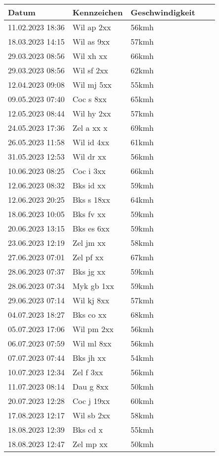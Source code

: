 \begin{description}
\begin{table}[htbp]
	\begin{tabular}{lllll}
		\toprule
		Datum  & Kennzeichen  & Geschwindigkeit \\
		\midrule
 11.02.2023 18:36 & Wil ap 2xx & 56kmh \\
 18.03.2023 14:15 & Wil as 9xx & 57kmh \\
 29.03.2023 08:56 & Wil xh xx & 66kmh \\
 29.03.2023 08:56 & Wil sf 2xx & 62kmh \\
 12.04.2023 09:08 & Wil mj 5xx & 55kmh \\
 09.05.2023 07:40 & Coc s 8xx & 65kmh \\
 12.05.2023 08:44 & Wil hy 2xx & 57kmh \\
 24.05.2023 17:36 & Zel a xx x & 69kmh \\
 26.05.2023 11:58 & Wil id 4xx & 61kmh \\
 31.05.2023 12:53 & Wil dr xx & 56kmh \\
 10.06.2023 08:25 & Coc i 3xx & 66kmh \\
 12.06.2023 08:32 & Bks id xx & 59kmh \\
 12.06.2023 20:25 & Bks s 18xx & 64kmh \\
 18.06.2023 10:05 & Bks fv xx & 59kmh \\
 20.06.2023 13:15 & Bks es 6xx & 59kmh \\
 23.06.2023 12:19 & Zel jm xx & 58kmh \\
 27.06.2023 07:01 & Zel pf xx & 67kmh \\
 28.06.2023 07:37 & Bks jg xx & 59kmh \\
 28.06.2023 07:34 & Myk gb 1xx & 59kmh \\
 29.06.2023 07:14 & Wil kj 8xx & 57kmh \\
 04.07.2023 18:27 & Bks co xx & 68kmh \\
 05.07.2023 17:06 & Wil pm 2xx & 56kmh \\
 06.07.2023 07:59 & Wil ml 8xx & 56kmh \\
 07.07.2023 07:44 & Bks jh xx & 54kmh \\
 10.07.2023 12:34 & Zel f 3xx & 56kmh \\
 11.07.2023 08:14 & Dau g 8xx & 50kmh \\
 20.07.2023 12:28 & Coc j 19xx & 60kmh \\
 17.08.2023 12:17 & Wil sb 2xx & 58kmh \\
 18.08.2023 12:39 & Bks cd x & 55kmh \\
 18.08.2023 12:47 & Zel mp xx & 50kmh \\

\end{tabular}
\end{table}
\end{description}
